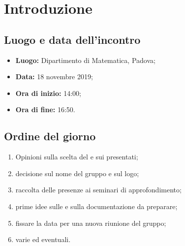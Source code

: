 \section*{Introduzione}

\subsection*{Luogo e data dell'incontro}
	\begin{itemize}
		\item \textbf{Luogo:} Dipartimento di Matematica, Padova;

		\item \textbf{Data:} 18 novembre 2019;

		\item \textbf{Ora di inizio:} 14:00;
		\item \textbf{Ora di fine:} 16:50.
	\end{itemize}

\subsection*{Ordine del giorno}
	\begin{enumerate}

		\item Opinioni sulla scelta del  e sui  presentati;
		\item decisione sul nome del gruppo e sul logo;
		\item raccolta delle presenze ai seminari di approfondimento;
		\item prime idee sulle  e sulla documentazione da preparare;
		\item fissare la data per una nuova riunione del gruppo;
		\item varie ed eventuali.

	\end{enumerate}

